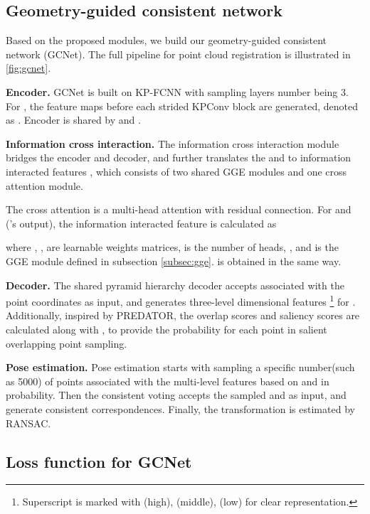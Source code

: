 \documentclass[10pt,twocolumn,letterpaper]{article}
\begin{document}
\vspace{-1.em}
\subsection{Geometry-guided consistent network}
\vspace{-.25em}
Based on the proposed modules, we build our geometry-guided consistent network (GCNet). The full pipeline for point cloud registration is illustrated in \cref{fig:gcnet}.

\textbf{Encoder.} GCNet is built on KP-FCNN\cite{thomas2019kpconv} with sampling layers number  being 3. For , the feature maps before each strided KPConv block are generated, denoted as . Encoder is shared by  and .

\textbf{Information cross interaction.} The information cross interaction module bridges the encoder and decoder, and further translates the  and  to information interacted features , which consists of two shared GGE modules and one cross attention module. 

The cross attention is a multi-head attention with residual connection.
For  and  ('s output), the information interacted feature  is calculated as 

where 
, ,   are learnable weights matrices,  is the number of heads, , and  is the GGE module defined in subsection \ref{subsec:gge}. 
 is obtained in the same way.

\textbf{Decoder.} The shared pyramid hierarchy decoder accepts  associated with the point coordinates as input, and generates three-level  dimensional features \footnote{Superscript is marked with (high), (middle), (low) for clear representation.} for . Additionally, inspired by PREDATOR\cite{huang2021predator}, the overlap scores  and saliency scores  are calculated along with , to provide the probability for each point in salient overlapping point sampling.



\textbf{Pose estimation.} Pose estimation starts with sampling a specific number(such as 5000) of points associated with the multi-level features based on  and  in probability. Then the consistent voting accepts the sampled  and  as input, and generate consistent correspondences. Finally, the transformation  is estimated by RANSAC.

\subsection{Loss function for GCNet}
\end{document}
